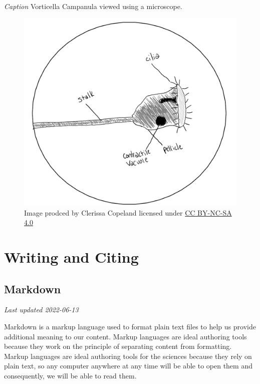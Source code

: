 \documentclass[
]{book}
\begin{document}
\emph{Caption} Vorticella Campanula viewed using a microscope.

\begin{figure}
\centering
\includegraphics{images/JSSG_poor-journal-style-fig-1.png}
\caption{Image prodced by Clerissa Copeland licensed under \href{https://creativecommons.org/licenses/by-nc-sa/4.0/}{CC BY-NC-SA 4.0}}
\end{figure}

\hypertarget{part-writing-and-citing}{%
\part*{Writing and Citing}\label{part-writing-and-citing}}

\hypertarget{markdown-1}{%
\chapter{Markdown}\label{markdown-1}}

\emph{Last updated 2022-06-13}

Markdown is a markup language used to format plain text files to help us provide additional meaning to our content. Markup languages are ideal authoring tools because they work on the principle of separating content from formatting. Markup languages are ideal authoring tools for the sciences because they rely on plain text, so any computer anywhere at any time will be able to open them and consequently, we will be able to read them.
\end{document}
